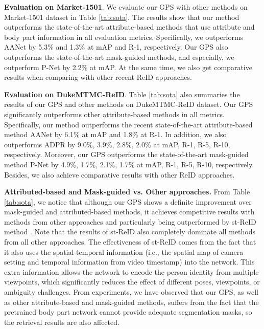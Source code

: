 \documentclass[final]{cvpr}
\begin{document}
\textbf{Evaluation on Market-1501}. We evaluate our GPS with other methods on Market-1501 dataset in Table \ref{tab:sota}. The results show that our method outperforms the state-of-the-art attribute-based methods \cite{aanet} that use attribute and body part information in all evaluation metrics. Specifically, we outperforms AANet \cite{aanet} by 5.3\% and 1.3\% at mAP and R-1, respectively. Our GPS also outperforms the state-of-the-art mask-guided methods, and especially, we outperform P-Net \cite{p2net} by 2.2\% at mAP. At the same time, we also get comparative results when comparing with other recent ReID approaches.

\textbf{Evaluation on DukeMTMC-ReID}. Table \ref{tab:sota} also summaries the results of our GPS and other methods on DukeMTMC-ReID dataset. Our GPS significantly outperforms other attribute-based methods in all metrics. Specifically, our method outperforms the recent state-of-the-art attribute-based method AANet \cite{aanet} by 6.1\% at mAP and 1.8\% at R-1. In addition, we also outperforms ADPR \cite{apdr} by 9.0\%, 3.9\%, 2.8\%, 2.0\% at mAP, R-1, R-5, R-10, respectively. Moreover, our GPS outperforms the state-of-the-art mask-guided method P-Net \cite{p2net} by 4.9\%, 1.7\%, 2.1\%, 1.7\% at mAP, R-1, R-5, R-10, respectively. Besides, we also achieve comparative results with other ReID approaches.

\textbf{Attributed-based and Mask-guided vs. Other approaches.} From Table \ref{tab:sota}, we notice that although our GPS shows a definite improvement over mask-guided and attributed-based methods, it achieves competitive results with methods from other approaches and particularly being outperformed by st-ReID method \cite{st-ReID}. Note that the results of st-ReID also completely dominate all methods from all other approaches. The effectiveness of st-ReID comes from the fact that it also uses the spatial-temporal information (i.e., the spatial map of camera setting and temporal information from video timestamp) into the network. This extra information allows the network to encode the person identity from multiple viewpoints, which significantly reduces the effect of different poses, viewpoints, or ambiguity challenges. From experiments, we have observed that our GPS, as well as other attribute-based and mask-guided methods, suffers from the fact that the pretrained body part network cannot provide adequate segmentation masks, so the retrieval results are also affected.
\end{document}
